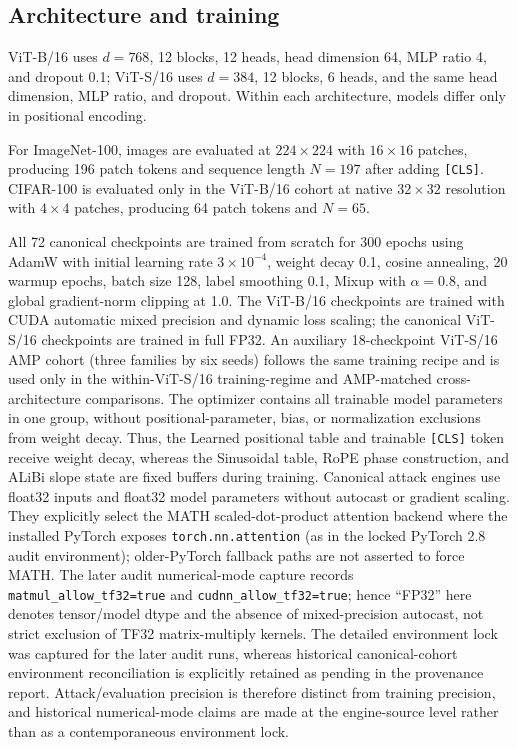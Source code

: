 \documentclass[preprint,12pt,authoryear]{elsarticle}
\begin{document}
\subsection{Architecture and training}

ViT-B/16 uses $d=768$, 12 blocks, 12 heads, head dimension 64, MLP
ratio 4, and dropout 0.1; ViT-S/16 uses $d=384$, 12 blocks, 6 heads, and
the same head dimension, MLP ratio, and dropout. Within each architecture,
models differ only in positional encoding.

For ImageNet-100, images are evaluated at $224\times224$ with
$16\times16$ patches, producing 196 patch tokens and sequence length
$N=197$ after adding \texttt{[CLS]}. CIFAR-100 is evaluated only in the
ViT-B/16 cohort at native $32\times32$ resolution with $4\times4$
patches, producing 64 patch tokens and $N=65$.

All 72 canonical checkpoints are trained from scratch for 300 epochs
using AdamW with initial learning rate $3\times10^{-4}$, weight decay 0.1,
cosine annealing, 20 warmup epochs, batch size 128, label smoothing 0.1,
Mixup with $\alpha=0.8$, and global gradient-norm clipping at 1.0. The
ViT-B/16 checkpoints are trained with
CUDA automatic mixed precision and dynamic loss scaling; the canonical
ViT-S/16 checkpoints are trained in full FP32. An auxiliary 18-checkpoint
ViT-S/16 AMP cohort (three families by six seeds) follows the same training
recipe and is used only in the within-ViT-S/16 training-regime and
AMP-matched cross-architecture comparisons. The optimizer contains all trainable model
parameters in one group, without positional-parameter, bias, or
normalization exclusions from weight decay. Thus, the Learned positional
table and trainable \texttt{[CLS]} token receive weight decay, whereas
the Sinusoidal table, RoPE phase construction, and ALiBi slope state are
fixed buffers during training. Canonical attack engines use float32 inputs and float32 model parameters
without autocast or gradient scaling. They explicitly select the MATH
scaled-dot-product attention backend where the installed PyTorch exposes
\texttt{torch.nn.attention} (as in the locked PyTorch 2.8 audit environment);
older-PyTorch fallback paths are not asserted to force MATH. The later audit numerical-mode capture records
\texttt{matmul\_allow\_tf32=true} and \texttt{cudnn\_allow\_tf32=true}; hence
``FP32'' here denotes tensor/model dtype and the absence of mixed-precision
autocast, not strict exclusion of TF32 matrix-multiply kernels. The detailed
environment lock was captured for the later audit runs, whereas historical
canonical-cohort environment reconciliation is explicitly retained as pending
in the provenance report. Attack/evaluation precision is therefore distinct
from training precision, and historical numerical-mode claims are made at the
engine-source level rather than as a contemporaneous environment lock.
\end{document}
